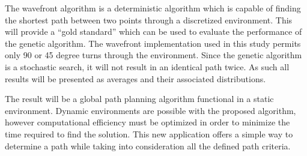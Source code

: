 The wavefront algorithm is a deterministic algorithm which is capable of finding the shortest path between two points through a discretized environment. This will provide a ``gold standard'' which can be used to evaluate the performance of the genetic algorithm. The wavefront implementation used in this study permits  only 90 or 45 degree turns through the environment. Since the genetic algorithm is a stochastic search, it will not result in an identical path twice. As such all results will be presented as averages and their associated distributions.

The result will be a global path planning algorithm functional in a static environment. Dynamic environments are possible with the proposed algorithm, however computational efficiency must be optimized in order to minimize the time required to find the solution. This new application offers a simple way to determine a path while taking into consideration all the defined path criteria.
